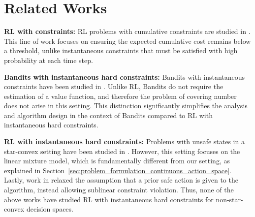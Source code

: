 \section{Related Works}
\label{App:RelatedWorks}
\textbf{RL with constraints:} RL problems with cumulative constraints are studied in 
\citet{wu2016conservative, achiam2017constrained, tessler2018reward, yang2019projection, efroni2020exploration, NEURIPS2020_ae95296e, ding2021provably, bai2022achieving, wei2022triple, paternain2022safe, ghosh2022provably, vaswani2022near, ghosh2022achieving, ding2023provably, ghosh2023achieving, huang2023safe, ghosh2024towards}. This line of work focuses on ensuring the expected cumulative cost remains below a threshold, unlike instantaneous constraints that must be satisfied with high probability at each time step.

\textbf{Bandits with instantaneous hard constraints:} Bandits with instantaneous constraints have been studied in \citet{amani2019linear, khezeli2020safe, moradipari2020linear, moradipari2020stage, moradipari2021safe, pacchiano2021stochastic, zhou2022kernelized, deng2022interference, pacchiano2024contextual, hutchinson2024directional, afsharrad2024convex}. Unlike RL, Bandits do not require the estimation of a value function, and therefore the problem of covering number does not arise in this setting. This distinction significantly simplifies the analysis and algorithm design in the context of Bandits compared to RL with instantaneous hard constraints.

\textbf{RL with instantaneous hard constraints:} Problems with unsafe states in a star-convex setting have been studied in \citet{shi2023near}. However, this setting focuses on the linear mixture model, which is fundamentally different from our setting, as explained in Section~\ref{sec:problem_formulation_continuous_action_space}. Lastly, work in \citet{wei2024safe} relaxed the assumption that a prior safe action is given to the algorithm, instead allowing sublinear constraint violation. Thus, none of the above works have studied RL with instantaneous hard constraints for non-star-convex decision spaces.